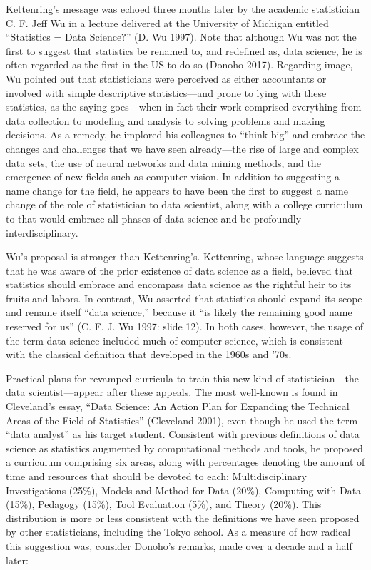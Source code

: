 \documentclass[
  letterpaper,
]{report}
\begin{document}
Kettenring's message was echoed three months later by the academic
statistician C. F. Jeff Wu in a lecture delivered at the University of
Michigan entitled ``Statistics = Data Science?'' (D. Wu 1997). Note that
although Wu was not the first to suggest that statistics be renamed to,
and redefined as, data science, he is often regarded as the first in the
US to do so (Donoho 2017). Regarding image, Wu pointed out that
statisticians were perceived as either accountants or involved with
simple descriptive statistics---and prone to lying with these
statistics, as the saying goes---when in fact their work comprised
everything from data collection to modeling and analysis to solving
problems and making decisions. As a remedy, he implored his colleagues
to ``think big'' and embrace the changes and challenges that we have
seen already---the rise of large and complex data sets, the use of
neural networks and data mining methods, and the emergence of new fields
such as computer vision. In addition to suggesting a name change for the
field, he appears to have been the first to suggest a name change of the
role of statistician to data scientist, along with a college curriculum
to that would embrace all phases of data science and be profoundly
interdisciplinary.

Wu's proposal is stronger than Kettenring's. Kettenring, whose language
suggests that he was aware of the prior existence of data science as a
field, believed that statistics should embrace and encompass data
science as the rightful heir to its fruits and labors. In contrast, Wu
asserted that statistics should expand its scope and rename itself
``data science,'' because it ``is likely the remaining good name
reserved for us'' (C. F. J. Wu 1997: slide 12). In both cases, however,
the usage of the term data science included much of computer science,
which is consistent with the classical definition that developed in the
1960s and '70s.

Practical plans for revamped curricula to train this new kind of
statistician---the data scientist---appear after these appeals. The most
well-known is found in Cleveland's essay, ``Data Science: An Action Plan
for Expanding the Technical Areas of the Field of Statistics''
(Cleveland 2001), even though he used the term ``data analyst'' as his
target student. Consistent with previous definitions of data science as
statistics augmented by computational methods and tools, he proposed a
curriculum comprising six areas, along with percentages denoting the
amount of time and resources that should be devoted to each:
Multidisciplinary Investigations (25\%), Models and Method for Data
(20\%), Computing with Data (15\%), Pedagogy (15\%), Tool Evaluation
(5\%), and Theory (20\%). This distribution is more or less consistent
with the definitions we have seen proposed by other statisticians,
including the Tokyo school. As a measure of how radical this suggestion
was, consider Donoho's remarks, made over a decade and a half later:
\end{document}
